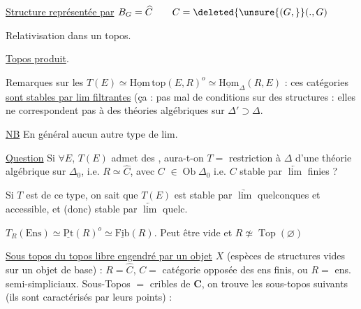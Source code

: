 
\uline{Structure représentée par} $B_G=\widehat C\qquad C=\deleted{\unsure{(G,}}(\mathord{.},G)$

Relativisation dans un topos.

\uline{Topos produit}.

Remarques sur les $T(E)\simeq\underline{\mathrm{Hom}}\,\mathrm{top}(E,R)^o\simeq\underline{\mathrm{Hom}}_\Delta(R,E)$ : ces catégories \uline{sont stables par \uline{lim} filtrantes} (ça  : pas mal de conditions sur des structures : elles ne correspondent pas à des théories algébriques sur   $\Delta'\supset\Delta$.

\uline{NB} En général aucun autre type de lim.

\uline{Question} Si $\forall E$, $T(E)$ admet des  ,  aura-t-on $T=$ restriction à $\Delta$ d'une théorie algébrique sur $\Delta_0$, i.e. $R\simeq\widehat C$, avec $C$  $\in\operatorname{Ob}\Delta_0$ i.e. $C$ stable par $\underleftarrow{\lim}$ finies ?

Si $T$ est de ce type, on sait que $T(E)$ est \unsure{$\simeq$} stable par $\underrightarrow{\lim}$  quelconques et accessible,  et (donc) stable par $\underleftarrow{\lim}$ quelc.

$T_R(\mathrm{Ens})\simeq\underline{\mathrm{Pt}}(R)^o\simeq\underline{\mathrm{Fib}}(R)$. Peut être vide et $R\not\simeq\operatorname{Top}(\varnothing)$

\uline{Sous topos du topos libre  engendré par un objet} $X$ (espèces de structures vides sur un objet de base) :  $R=\widehat C$, $C=$ catégorie opposée des ens finis, ou $R=$ ens. semi-simpliciaux.  Sous-Topos  $=$ cribles de $\mathbf C$, on trouve les sous-topos suivants (ils sont caractérisés par leurs points) :


